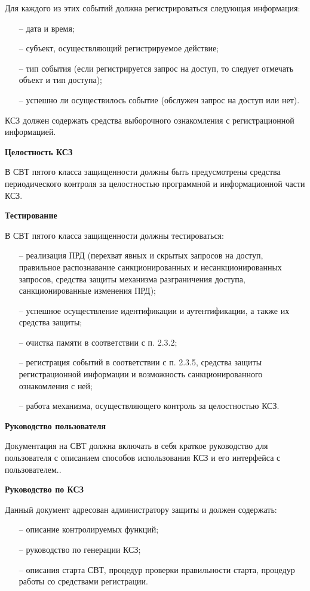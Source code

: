 Для каждого из этих событий должна регистрироваться следующая
информация:
\begin{itemize}
  \item [--] дата и время;
  \item [--] субъект, осуществляющий регистрируемое действие;
  \item [--] тип события (если регистрируется запрос на доступ, то следует отмечать
   объект и тип доступа);
  \item [--] успешно ли осуществилось событие (обслужен запрос на доступ или нет).
\end{itemize}
КСЗ должен содержать средства выборочного ознакомления с
регистрационной информацией.

\textbf{Целостность КСЗ}

В СВТ пятого класса защищенности должны быть предусмотрены
средства периодического контроля за целостностью программной и
информационной части КСЗ.

\textbf{Тестирование}

В СВТ пятого класса защищенности должны тестироваться:
\begin{itemize}
  \item [--] реализация ПРД (перехват явных и скрытых запросов на доступ,
  правильное распознавание санкционированных и несанкционированных
  запросов, средства защиты механизма разграничения доступа,
  санкционированные изменения ПРД);
  \item [--] успешное осуществление идентификации и аутентификации, а также их
  средства защиты;
  \item [--] очистка памяти в соответствии с п. 2.3.2;
  \item [--] регистрация событий в соответствии с п. 2.3.5, средства защиты
  регистрационной информации и возможность санкционированного 
  ознакомления с ней;
  \item [--] работа механизма, осуществляющего контроль за целостностью КСЗ.
\end{itemize}

\textbf{Руководство пользователя}

Документация на СВТ должна включать в себя краткое руководство для
пользователя с описанием способов использования КСЗ и его интерфейса с
пользователем..

\textbf{Руководство по КСЗ}

Данный документ адресован администратору защиты и должен
содержать:

\begin{itemize}
  \item [--] описание контролируемых функций;
  \item [--] руководство по генерации КСЗ;
  \item [--] описания старта СВТ, процедур проверки правильности старта, процедур
  работы со средствами регистрации.
\end{itemize}


